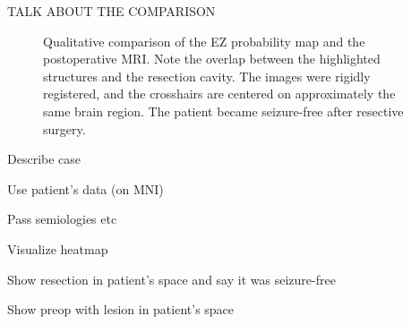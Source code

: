 TALK ABOUT THE COMPARISON

\begin{figure}
  \centering
  \caption[Comparison of the probability map and the postoperative MRI]{
    Qualitative comparison of the \ac{EZ} probability map and the postoperative \ac{MRI}.
    Note the overlap between the highlighted structures and the resection cavity.
    The images were rigidly registered, and the crosshairs are centered on approximately the same brain region.
    The patient became seizure-free after resective surgery.
  }
  \label{fig:svt_resection}
\end{figure}



Describe case

Use patient's data (on MNI)

Pass semiologies etc

Visualize heatmap

Show resection in patient's space and say it was seizure-free

Show preop with lesion in patient's space
